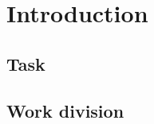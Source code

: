 \documentclass[doc/report.tex]{subfiles}
\begin{document}
\section{Introduction}

\subsection{Task}

\subsection{Work division}
    
\end{document}
